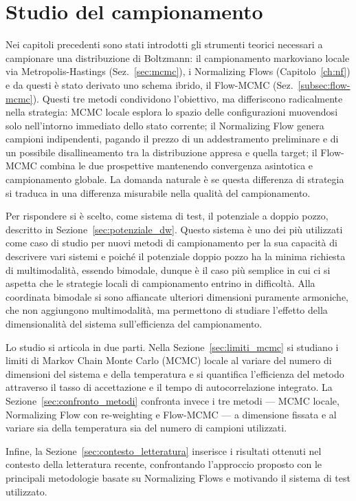 \chapter{Studio del campionamento}
\label{ch:studio}

Nei capitoli precedenti sono stati introdotti gli strumenti teorici necessari a campionare una distribuzione di Boltzmann: il campionamento markoviano locale via Metropolis-Hastings (Sez.~\ref{sec:mcmc}), i Normalizing Flows (Capitolo~\ref{ch:nf}) e da questi è stato derivato uno schema ibrido, il Flow-MCMC (Sez.~\ref{subsec:flow-mcmc}). Questi tre metodi condividono l'obiettivo, ma differiscono radicalmente nella strategia: MCMC locale esplora lo spazio delle configurazioni muovendosi solo nell'intorno immediato dello stato corrente; il Normalizing Flow genera campioni indipendenti, pagando il prezzo di un addestramento preliminare e di un possibile disallineamento tra la distribuzione appresa e quella target; il Flow-MCMC combina le due prospettive mantenendo convergenza asintotica e campionamento globale. La domanda naturale è se questa differenza di strategia si traduca in una differenza misurabile nella qualità del campionamento.

Per rispondere si è scelto, come sistema di test, il potenziale a doppio pozzo, descritto in Sezione~\ref{sec:potenziale_dw}. Questo sistema è uno dei più utilizzati come caso di studio per nuovi metodi di campionamento per la sua capacità di descrivere vari sistemi e poiché il potenziale doppio pozzo ha la minima richiesta di multimodalità, essendo bimodale, dunque è il caso più semplice in cui ci si aspetta che le strategie locali di campionamento entrino in difficoltà. Alla coordinata bimodale si sono affiancate ulteriori dimensioni puramente armoniche, che non aggiungono multimodalità, ma permettono di studiare l'effetto della dimensionalità del sistema sull'efficienza del campionamento.

Lo studio si articola in due parti. Nella Sezione~\ref{sec:limiti_mcmc} si studiano i limiti di Markov Chain Monte Carlo (MCMC) locale al variare del numero di dimensioni del sistema e della temperatura e si quantifica l'efficienza del metodo attraverso il tasso di accettazione e il tempo di autocorrelazione integrato. La Sezione~\ref{sec:confronto_metodi} confronta invece i tre metodi --- MCMC locale, Normalizing Flow con re-weighting e Flow-MCMC --- a dimensione fissata e al variare sia della temperatura sia del numero di campioni utilizzati.

Infine, la Sezione~\ref{sec:contesto_letteratura} inserisce i risultati ottenuti nel contesto della letteratura recente, confrontando l'approccio proposto con le principali metodologie basate su Normalizing Flows e motivando il sistema di test utilizzato.

